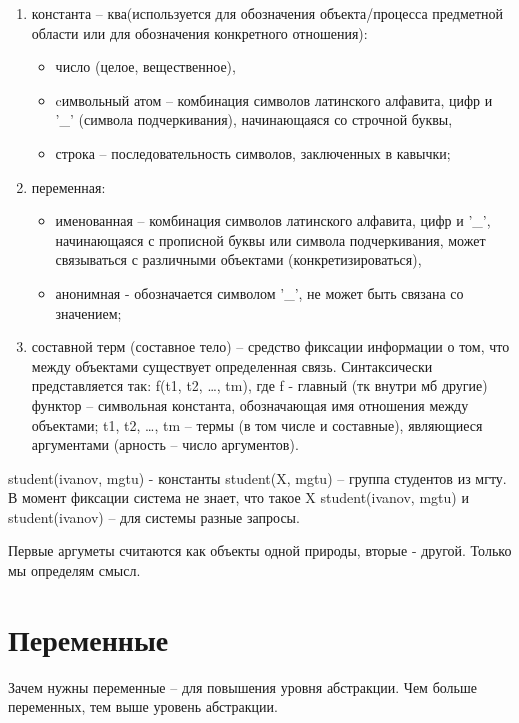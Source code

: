 \documentclass[12pt]{report}
\begin{document}
\begin{enumerate}
	\item константа -- ква(используется для обозначения объекта/процесса предметной области или для обозначения конкретного отношения): 
	\begin{itemize}
		\item число (целое, вещественное),
		\item cимвольный атом -- комбинация символов латинского алфавита, цифр и ’\_’ (символа подчеркивания), начинающаяся со строчной буквы,
		\item строка -- последовательность символов, заключенных в кавычки;
	\end{itemize}
	\item переменная:
	\begin{itemize}
		\item именованная -- комбинация символов латинского алфавита, цифр и ’\_’, начинающаяся с прописной буквы или символа подчеркивания, может связываться с различными объектами (конкретизироваться),
		\item анонимная  - обозначается символом ’\_’, не может быть связана со значением;
	\end{itemize}
	\item составной терм (составное тело) -- средство фиксации информации о том, что между объектами существует определенная связь. Синтаксически представляется так: f(t1, t2, …, tm), где f -  главный (тк внутри мб другие) функтор -- символьная константа, обозначающая имя отношения между объектами; t1, t2, …, tm – термы (в том  числе  и составные), являющиеся аргументами (арность -- число аргументов).
\end{enumerate}



student(ivanov, mgtu) - константы
student(X, mgtu) -- группа студентов из мгту. В момент фиксации система не знает, что такое X
student(ivanov, mgtu) и student(ivanov) -- для системы разные запросы.

Первые аргуметы считаются как объекты одной природы, вторые - другой. Только мы определям смысл.









\section{Переменные}

Зачем нужны переменные -- для повышения уровня абстракции. Чем больше переменных, тем выше уровень абстракции.
\end{document}

